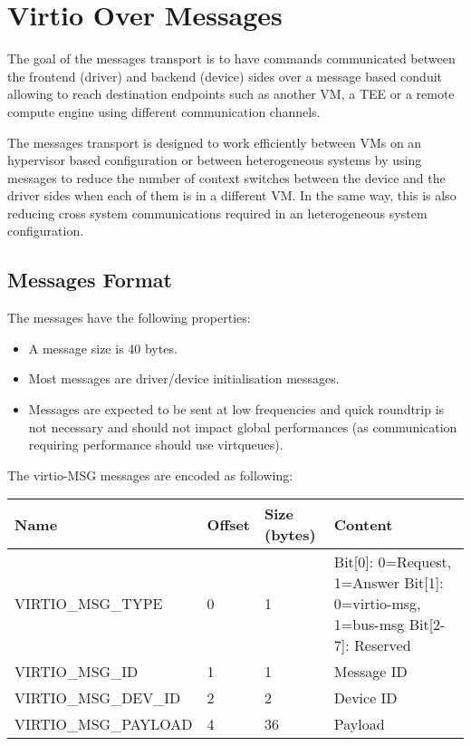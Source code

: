\section{Virtio Over Messages}\label{sec:Virtio Transport Options / Virtio Over Messages}

The goal of the messages transport is to have commands communicated between the
frontend (driver) and backend (device) sides over a message based conduit
allowing to reach destination endpoints such as another VM, a TEE or a remote
compute engine using different communication channels.

The messages transport is designed to work efficiently between VMs on an hypervisor
based configuration or between heterogeneous systems by using messages to
reduce the number of context switches between the device and the driver sides
when each of them is in a different VM. In the same way, this is also reducing
cross system communications required in an heterogeneous system configuration.

\subsection{Messages Format}\label{sec:Virtio Transport Options / Virtio Over Messages / Messages Format}

The messages have the following properties:
\begin{itemize}
\item A message size is 40 bytes.
\item Most messages are driver/device initialisation messages.
\item Messages are expected to be sent at low frequencies and quick roundtrip is
  not necessary and should not impact global performances (as communication
  requiring performance should use virtqueues).
\end{itemize}

The virtio-MSG messages are encoded as following:

\begin{tabularx}{\textwidth}{|l|l|l|X|}
\hline
Name & Offset & Size (bytes) & Content \\
\hline \hline
VIRTIO_MSG_TYPE & 0 & 1 & Bit[0]: 0=Request, 1=Answer \newline Bit[1]: 0=virtio-msg, 1=bus-msg \newline Bit[2-7]: Reserved \\
\hline
VIRTIO_MSG_ID & 1 & 1 & Message ID \\
\hline
VIRTIO_MSG_DEV_ID & 2 & 2 & Device ID \\
\hline
VIRTIO_MSG_PAYLOAD & 4 & 36 & Payload \\
\hline
\end{tabularx}

